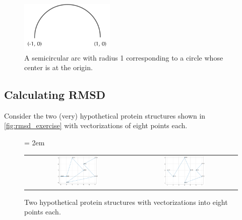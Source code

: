 \begin{figure}[h]
	\centering
	\mySfFamily
	\includegraphics[width = 0.4\textwidth]{../images/semicircular_arc.png}
	\caption{A semicircular arc with radius 1 corresponding to a circle whose center is at the origin.}
	\label{fig:semicircular_arc}
\end{figure}

\begin{exercise}\end{exercise}

\begin{exercise}\end{exercise}

\subsection{Calculating RMSD}

Consider the two (very) hypothetical protein structures shown in \autoref{fig:rmsd_exercise} with vectorizations of eight points each.\\

\begin{figure}[h]
	\centering
	\mySfFamily
	\tabcolsep = 2em
	\begin{tabular}{c c}
	\includegraphics[width = 0.4\textwidth]{../images/rmsd_exercise1.png} & \includegraphics[width = 0.4\textwidth]{../images/rmsd_exercise2.png}
	\end{tabular}
	\caption{Two hypothetical protein structures with vectorizations into eight points each.}
	\label{fig:rmsd_exercise}
\end{figure}

